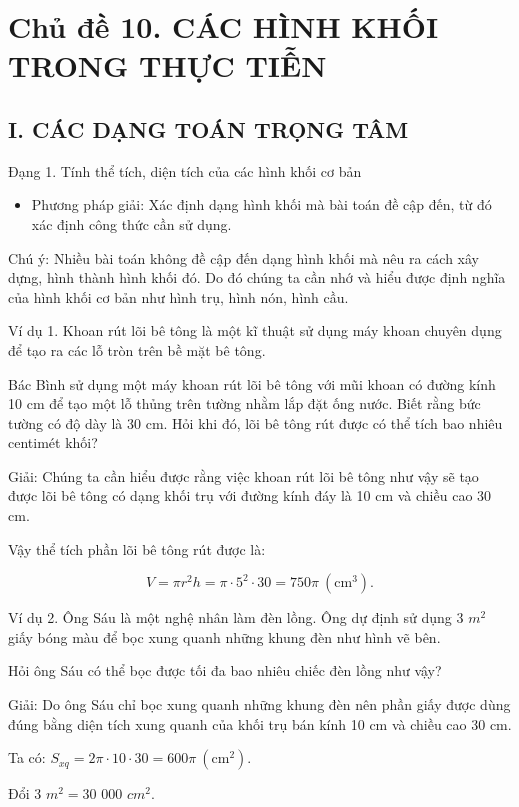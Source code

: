 \documentclass[%
    fontsize=12pt,%
    chapterprefix=false,%
    open=right,%
    twoside=false,%
    numbers=noenddot,%
    headings=optiontohead,%
    final,%
    DIV=15,%
    parskip=half %
]{scrbook}
\begin{document}
\section{Chủ đề 10. CÁC HÌNH KHỐI TRONG THỰC TIỄN}
\subsection{I. CÁC DẠNG TOÁN TRỌNG TÂM}

Đạng 1. Tính thể tích, diện tích của các hình khối cơ bản

\begin{itemize}
  \item Phương pháp giải: Xác định dạng hình khối mà bài toán đề cập đến, từ đó xác định công thức cần sử dụng.
\end{itemize}

Chú ý: Nhiều bài toán không đề cập đến dạng hình khối mà nêu ra cách xây dựng, hình thành hình khối đó. Do đó chúng ta cần nhớ và hiểu được định nghĩa của hình khối cơ bản như hình trụ, hình nón, hình cầu.

Ví dụ 1. Khoan rút lõi bê tông là một kĩ thuật sử dụng máy khoan chuyên dụng để tạo ra các lỗ tròn trên bề mặt bê tông.

Bác Bình sử dụng một máy khoan rút lõi bê tông với mũi khoan có đường kính 10 cm để tạo một lỗ thủng trên tường nhằm lắp đặt ống nước. Biết rằng bức tường có độ dày là 30 cm. Hỏi khi đó, lõi bê tông rút được có thể tích bao nhiêu centimét khối?

Giải: Chúng ta cần hiểu được rằng việc khoan rút lõi bê tông như vậy sẽ tạo được lõi bê tông có dạng khối trụ với đường kính đáy là 10 cm và chiều cao 30 cm.

Vậy thể tích phần lõi bê tông rút được là:

\[
V = \pi r^2 h = \pi \cdot 5^2 \cdot 30 = 750\pi \ (\text{cm}^3).
\]

Ví dụ 2. Ông Sáu là một nghệ nhân làm đèn lồng. Ông dự định sử dụng 3 $m^2$ giấy bóng màu để bọc xung quanh những khung đèn như hình vẽ bên.

Hỏi ông Sáu có thể bọc được tối đa bao nhiêu chiếc đèn lồng như vậy?

Giải: Do ông Sáu chỉ bọc xung quanh những khung đèn nên phần giấy được dùng đúng bằng diện tích xung quanh của khối trụ bán kính 10 cm và chiều cao 30 cm.

Ta có: $ S_{xq} = 2\pi \cdot 10 \cdot 30 = 600\pi \ (\text{cm}^2) $.

Đổi 3 $m^2 = 30$ 000 $cm^2$.
\end{document}
